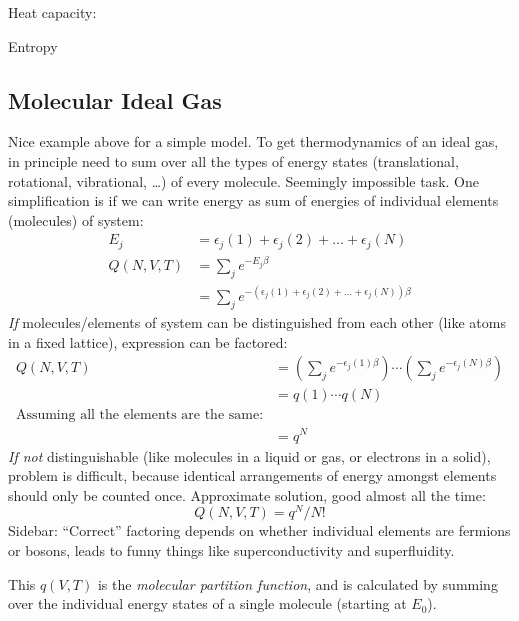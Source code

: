 \documentclass[11pt]{article}
\begin{document}
\noindent Heat capacity:

\noindent Entropy

\subsection{Molecular Ideal Gas}
\label{sec:org910c282}
Nice example above for a simple model.  To get thermodynamics of an ideal gas,
in principle need to sum over all the types of energy states (translational,
rotational, vibrational, \ldots{}) of every molecule.  Seemingly impossible task.
One simplification is if we can write energy as sum of energies of individual
elements (molecules) of system:
\begin{align}
  E_j&=\epsilon_j(1)+\epsilon_j(2) + ... + \epsilon_j(N) \\
  Q(N,V,T) &= \sum_j e^{-E_j\beta} \\
  &=\sum_je^{-(\epsilon_j(1)+\epsilon_j(2) + ... + \epsilon_j(N))\beta}
\end{align}
\emph{If} molecules/elements of system can be distinguished from each
        other (like atoms in a fixed lattice), expression can be factored:
  \begin{align}
    Q(N,V,T)&=\left ( \sum_j e^{-\epsilon_j(1)\beta}\right )\cdots \left ( \sum_j
      e^{-\epsilon_j(N)\beta}\right ) \\
  &= q(1)\cdots q(N) \\
  \text{Assuming all the elements are the same:}\\
  &= q^N
\end{align}
\emph{If not} distinguishable (like molecules in a liquid or gas, or
      electrons in a solid), problem is difficult, because identical
      arrangements of energy amongst elements should only be counted once.
      Approximate solution, good almost all the time:
\begin{equation}
  Q(N,V,T)=q^N/N!
\end{equation}
Sidebar: ``Correct'' factoring depends on whether individual elements
     are fermions or bosons, leads to funny things like superconductivity and
     superfluidity.

This \(q(V,T)\) is the \emph{molecular partition function}, and is calculated by
summing over the individual energy states of a single molecule (starting at \(E_0\)).
\end{document}

